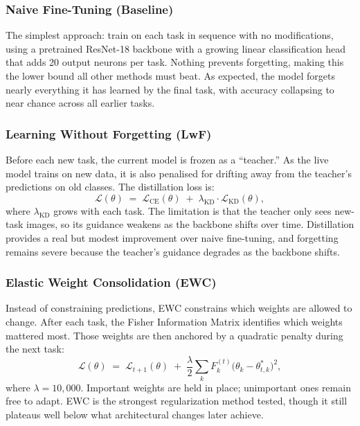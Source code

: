\documentclass{article}
\begin{document}
\subsubsection{Naive Fine-Tuning (Baseline)}

The simplest approach: train on each task in sequence with no modifications,
using a pretrained ResNet-18 backbone with a growing linear classification head
that adds 20 output neurons per task. Nothing prevents forgetting, making this
the lower bound all other methods must beat.
As expected, the model forgets nearly everything it has learned by the final task, with accuracy collapsing to near chance across all earlier tasks.

\subsubsection{Learning Without Forgetting (LwF)}

Before each new task, the current model is frozen as a ``teacher.'' As the
live model trains on new data, it is also penalised for drifting away from the
teacher's predictions on old classes. The distillation loss is:
\begin{equation}
  \mathcal{L}(\theta) \;=\; \mathcal{L}_{\mathrm{CE}}(\theta) \;+\;
  \lambda_{\mathrm{KD}} \cdot \mathcal{L}_{\mathrm{KD}}(\theta),
  \label{eq:lwf_total}
\end{equation}
where $\lambda_{\mathrm{KD}}$ grows with each task. The limitation is that
the teacher only sees new-task images, so its guidance weakens as the backbone
shifts over time.
Distillation provides a real but modest improvement over naive fine-tuning, and forgetting remains severe because the teacher's guidance degrades as the backbone shifts.

\subsubsection{Elastic Weight Consolidation (EWC)}

Instead of constraining predictions, EWC \citep{kirkpatrick2017overcoming}
constrains which weights are allowed to change. After each task, the Fisher
Information Matrix identifies which weights mattered most. Those weights are
then anchored by a quadratic penalty during the next task:
\begin{equation}
  \mathcal{L}(\theta) \;=\; \mathcal{L}_{t+1}(\theta) \;+\;
  \frac{\lambda}{2} \sum_{k} F^{(t)}_k
  \bigl(\theta_k - \theta_{t,k}^*\bigr)^2,
  \label{eq:ewc}
\end{equation}
where $\lambda = 10{,}000$. Important weights are held in place; unimportant
ones remain free to adapt.
EWC is the strongest regularization method tested, though it still plateaus well below what architectural changes later achieve.
\end{document}
